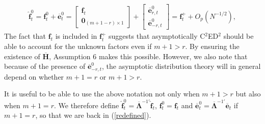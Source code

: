 \documentclass[12pt,fleqn]{article}
\def\*#1{\mathbf{#1}}
\def\+#1{\boldsymbol{#1}}
\begin{document}
\begin{align}
\widehat{\*{f}}_t^0 = \*f_t^{0} + \overline{\*e}_t^{0} = \left[\begin{array}{c} \*f_t \\
    \*{0}_{(m+1-r)\times 1} \end{array}\right] + \left[\begin{array}{c} \overline{\*e}_{r,t}^{0} \\
    \overline{\*e}_{-r,t}^{0} \end{array}\right] = \*f_t^+ +  O_p(N^{-1/2}),
\end{align}
The fact that $\*{f}_t$ is included in $\*f_t^+$ suggests that asymptotically C$^2$ED$^2$ should be able to account for the unknown factors even if $m + 1> r$. By ensuring the existence of $\overline{\*{H}}$, Assumption 6 makes this possible. However, we also note that because of the presence of $\overline{\*{e}}_{-r,t}^0$, the asymptotic distribution theory will in general depend on whether $m+1=r$ or $m +1> r$.

It is useful to be able to use the above notation not only when $m+1> r$ but also when $m+1=r$. We therefore define $\widehat{\*{f}}^0_t=\overline{\+{\Lambda}}^{-1\prime}\widehat{\*{f}}_t$, $\*{f}^0_t = \*{f}_t$ and $\overline{\*{e}}^0_t = \overline{\+{\Lambda}}^{-1\prime}\overline{\*{e}}_t$ if $m+1=r$, so that we are back in (\ref{redefined}).
\end{document}
